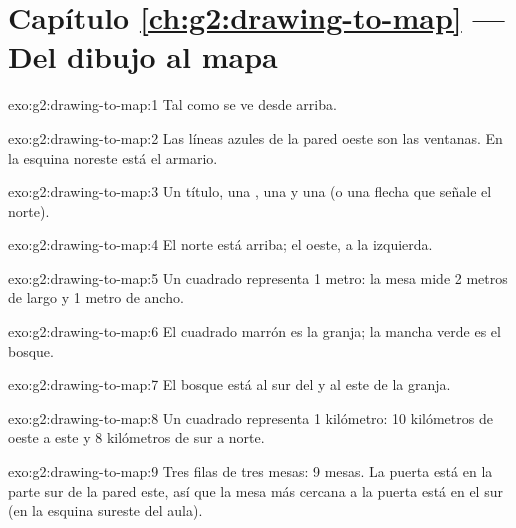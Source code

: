 \section*{Capítulo \ref{ch:g2:drawing-to-map} --- Del dibujo al mapa}

\begin{solution}{exo:g2:drawing-to-map:1}
Tal como se ve desde arriba.
\end{solution}

\begin{solution}{exo:g2:drawing-to-map:2}
Las líneas azules de la pared oeste son las ventanas. En la esquina noreste
está el armario.
\end{solution}

\begin{solution}{exo:g2:drawing-to-map:3}
Un título, una , una  y una  (o una flecha
que señale el norte).
\end{solution}

\begin{solution}{exo:g2:drawing-to-map:4}
El norte está arriba; el oeste, a la izquierda.
\end{solution}

\begin{solution}{exo:g2:drawing-to-map:5}
Un cuadrado representa 1 metro: la mesa mide 2 metros de largo y 1 metro de
ancho.
\end{solution}

\begin{solution}{exo:g2:drawing-to-map:6}
El cuadrado marrón es la granja; la mancha verde es el bosque.
\end{solution}

\begin{solution}{exo:g2:drawing-to-map:7}
El bosque está al sur del  y al este de la granja.
\end{solution}

\begin{solution}{exo:g2:drawing-to-map:8}
Un cuadrado representa 1 kilómetro: 10 kilómetros de oeste a este y
8 kilómetros de sur a norte.
\end{solution}

\begin{solution}{exo:g2:drawing-to-map:9}
Tres filas de tres mesas: 9 mesas. La puerta está en la parte sur de la
pared este, así que la mesa más cercana a la puerta está en el sur (en la
esquina sureste del aula).
\end{solution}

